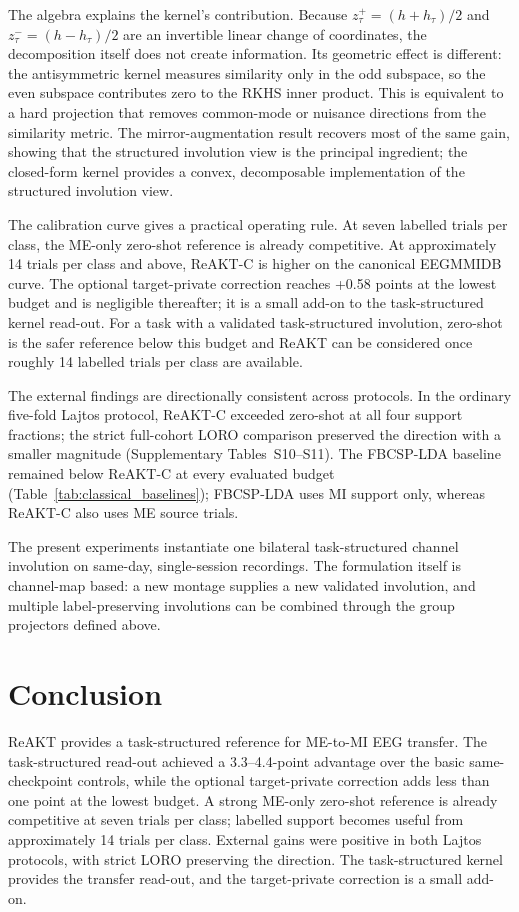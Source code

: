 \documentclass[preprint,12pt]{elsarticle}
\begin{document}
The algebra explains the kernel's contribution. Because $z^+_{\tau}=(h+h_{\tau})/2$ and $z^-_{\tau}=(h-h_{\tau})/2$ are an invertible linear change of coordinates, the decomposition itself does not create information. Its geometric effect is different: the antisymmetric kernel measures similarity only in the odd subspace, so the even subspace contributes zero to the RKHS inner product. This is equivalent to a hard projection that removes common-mode or nuisance directions from the similarity metric. The mirror-augmentation result recovers most of the same gain, showing that the structured involution view is the principal ingredient; the closed-form kernel provides a convex, decomposable implementation of the structured involution view.

The calibration curve gives a practical operating rule. At seven labelled trials per class, the ME-only zero-shot reference is already competitive. At approximately 14 trials per class and above, ReAKT-C is higher on the canonical EEGMMIDB curve. The optional target-private correction reaches +0.58 points at the lowest budget and is negligible thereafter; it is a small add-on to the task-structured kernel read-out. For a task with a validated task-structured involution, zero-shot is the safer reference below this budget and ReAKT can be considered once roughly 14 labelled trials per class are available.

The external findings are directionally consistent across protocols. In the ordinary five-fold Lajtos protocol, ReAKT-C exceeded zero-shot at all four support fractions; the strict full-cohort LORO comparison preserved the direction with a smaller magnitude (Supplementary Tables~S10--S11). The FBCSP-LDA baseline remained below ReAKT-C at every evaluated budget (Table~\ref{tab:classical_baselines}); FBCSP-LDA uses MI support only, whereas ReAKT-C also uses ME source trials.

The present experiments instantiate one bilateral task-structured channel involution on same-day, single-session recordings. The formulation itself is channel-map based: a new montage supplies a new validated involution, and multiple label-preserving involutions can be combined through the group projectors defined above. 

\section{Conclusion}
ReAKT provides a task-structured reference for ME-to-MI EEG transfer. The task-structured read-out achieved a 3.3--4.4-point advantage over the basic same-checkpoint controls, while the optional target-private correction adds less than one point at the lowest budget. A strong ME-only zero-shot reference is already competitive at seven trials per class; labelled support becomes useful from approximately 14 trials per class. External gains were positive in both Lajtos protocols, with strict LORO preserving the direction. The task-structured kernel provides the transfer read-out, and the target-private correction is a small add-on.
\end{document}
